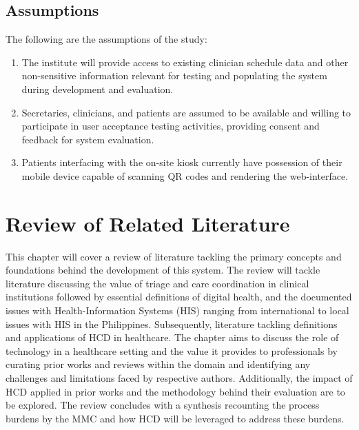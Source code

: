 \documentclass[11pt,a4paper,titlepage]{article}
\let\stdsection\section
\renewcommand\section{\newpage\stdsection}
\begin{document}
	\subsection{Assumptions}
	The following are the assumptions of the study: 
	\begin{enumerate}
		\item The institute will provide access to existing clinician schedule data and other non-sensitive information relevant for testing and populating the system during development and evaluation. 
		\item Secretaries, clinicians, and patients are assumed to be available and willing to participate in user acceptance testing activities, providing consent and feedback for system evaluation.  
		\item Patients interfacing with the on-site kiosk currently have possession of their mobile device capable of scanning QR codes and rendering the web-interface. 
	\end{enumerate}
	
	
	\section{Review of Related Literature}
	
	This chapter will cover a review of literature tackling the primary concepts and foundations behind the development of this system. The review will tackle literature discussing the value of triage and care coordination in clinical institutions followed by essential definitions of digital health, and the documented issues with Health-Information Systems (HIS) ranging from international to local issues with HIS in the Philippines. Subsequently, literature tackling definitions and applications of HCD in healthcare. The chapter aims to discuss the role of technology in a healthcare setting and the value it provides to professionals by curating prior works and reviews within the domain and identifying any challenges and limitations faced by respective authors. Additionally, the impact of HCD  applied in prior works and the methodology behind their evaluation are to be explored. The review concludes with a synthesis recounting the process burdens by the MMC and how HCD will be leveraged to address these burdens. 
\end{document}
